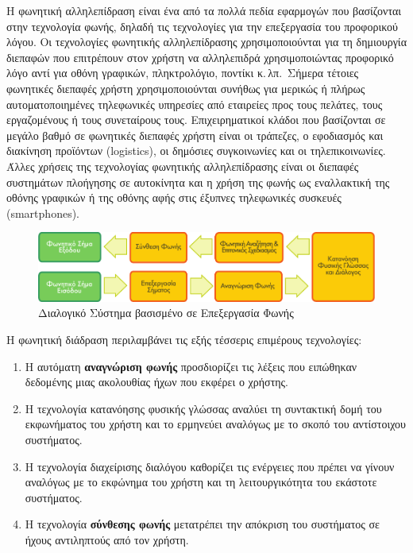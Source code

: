 \documentclass[]{../../metanetpaper}
\begin{document}
\begin{multicols}{2}
Η φωνητική αλληλεπίδραση είναι ένα από τα πολλά πεδία εφαρμογών που βασίζονται στην τεχνολογία φωνής, δηλαδή τις τεχνολογίες για την επεξεργασία του προφορικού λόγου. Οι τεχνολογίες φωνητικής αλληλεπίδρασης χρησιμοποιούνται για τη δημιουργία διεπαφών που επιτρέπουν στον χρήστη να αλληλεπιδρά χρησιμοποιώντας προφορικό λόγο αντί για οθόνη γραφικών, πληκτρολόγιο, ποντίκι κ.\,λπ.~Σήμερα τέτοιες φωνητικές διεπαφές χρήστη χρησιμοποιούνται συνήθως για μερικώς ή πλήρως αυτοματοποιημένες τηλεφωνικές υπηρεσίες από εταιρείες προς τους πελάτες, τους εργαζομένους ή τους συνεταίρους τους. Επιχειρηματικοί κλάδοι που βασίζονται σε μεγάλο βαθμό σε φωνητικές διεπαφές χρήστη είναι οι τράπεζες, ο εφοδιασμός και διακίνηση προϊόντων (logistics), οι δημόσιες συγκοινωνίες και οι τηλεπικοινωνίες. Άλλες χρήσεις της τεχνολογίας φωνητικής αλληλεπίδρασης είναι οι διεπαφές συστημάτων πλοήγησης σε αυτοκίνητα και η χρήση της φωνής ως εναλλακτική της οθόνης γραφικών ή της οθόνης αφής στις έξυπνες τηλεφωνικές συσκευές (smartphones).

\begin{figure}[htb]
  \center  \includegraphics[width=\textwidth]{../_media/greek/simple_speech-based_dialogue_architecture}
  \center
  \caption{Διαλογικό Σύστημα βασισμένο σε Επεξεργασία Φωνής}
  \label{fig:dialoguearch_de}
\end{figure}

Η φωνητική διάδραση περιλαμβάνει τις εξής τέσσερις επιμέρους τεχνολογίες:

\begin{enumerate}
\item Η αυτόματη \textbf{αναγνώριση φωνής} προσδιορίζει τις λέξεις που ειπώθηκαν δεδομένης μιας ακολουθίας ήχων που εκφέρει ο χρήστης.
\item Η τεχνολογία κατανόησης φυσικής γλώσσας αναλύει τη συντακτική δομή του εκφωνήματος του χρήστη και το ερμηνεύει αναλόγως με το σκοπό του αντίστοιχου συστήματος.
\item Η τεχνολογία διαχείρισης διαλόγου καθορίζει τις ενέργειες που πρέπει να γίνουν αναλόγως με το εκφώνημα του χρήστη και τη λειτουργικότητα του εκάστοτε συστήματος.    
\item Η τεχνολογία \textbf{σύνθεσης φωνής} μετατρέπει την απόκριση του συστήματος σε ήχους αντιληπτούς από τον χρήστη.
\end{enumerate}


\end{multicols}
\end{document}
